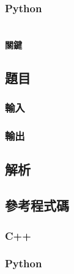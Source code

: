 \documentclass[a4paper,10pt]{article}
\begin{document}
\subsubsection{Python}

%

\section{}

\paragraph{關鍵}

\subsection{題目}



\subsubsection{輸入}



\subsubsection{輸出}



\subsection{解析}



\subsection{參考程式碼}

\subsubsection{C++}

%

\subsubsection{Python}

%
\end{document}
